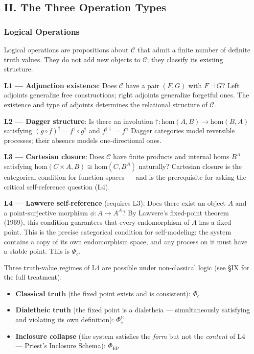 \documentclass[12pt,a4paper]{article}
\newcommand{\pilcrow}{\S}
\begin{document}
\subsection{II. The Three Operation Types}

\subsubsection{Logical Operations}

Logical operations are propositions about $\mathcal{C}$ that admit a finite number of definite truth values. They do not add new objects to $\mathcal{C}$; they classify its existing structure.

\textbf{L1 --- Adjunction existence}: Does $\mathcal{C}$ have a pair $(F, G)$ with $F \dashv G$? Left adjoints generalize free constructions; right adjoints generalize forgetful ones. The existence and type of adjoints determines the relational structure of $\mathcal{C}$.

\textbf{L2 --- Dagger structure}: Is there an involution $\dagger: \text{hom}(A,B) \to \text{hom}(B,A)$ satisfying $(g \circ f)^\dagger = f^\dagger \circ g^\dagger$ and $f^{\dagger\dagger} = f$? Dagger categories model reversible processes; their absence models one-directional ones.

\textbf{L3 --- Cartesian closure}: Does $\mathcal{C}$ have finite products and internal homs $B^A$ satisfying $\text{hom}(C \times A, B) \cong \text{hom}(C, B^A)$ naturally? Cartesian closure is the categorical condition for function spaces --- and is the prerequisite for asking the critical self-reference question (L4).

\textbf{L4 --- Lawvere self-reference} (requires L3): Does there exist an object $A$ and a point-surjective morphism $\phi: A \to A^A$? By Lawvere's fixed-point theorem (1969), this condition guarantees that every endomorphism of $A$ has a fixed point. This is the precise categorical condition for self-modeling: the system contains a copy of its own endomorphism space, and any process on it must have a stable point. This is $\Phi_c$.

Three truth-value regimes of L4 are possible under non-classical logic (see \pilcrow{}IX for the full treatment):

\begin{itemize}
    \item \textbf{Classical truth} (the fixed point exists and is consistent): $\Phi_c$
    \item \textbf{Dialetheic truth} (the fixed point is a dialetheia --- simultaneously satisfying and violating its own definition): $\Phi_c^\mathbb{C}$
    \item \textbf{Inclosure collapse} (the system satisfies the \emph{form} but not the \emph{content} of L4 --- Priest's Inclosure Schema): $\Phi_\text{EP}$
\end{itemize}
\end{document}
